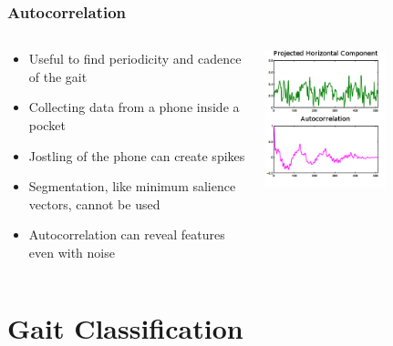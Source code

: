 \documentclass{beamer}
\begin{document}
\begin{frame}
\frametitle{Autocorrelation}
 \begin{columns}
  \begin{column}{.6\textwidth}
  \begin{itemize}
		\item Useful to find periodicity and cadence of the gait
		\item Collecting data from a phone inside a pocket
		\item Jostling of the phone can create spikes
		\item Segmentation, like minimum salience vectors, cannot be used
		\item Autocorrelation can reveal features even with noise
  \end{itemize}
  \end{column}
  \begin{column}{0.65\textwidth}
   \includegraphics[width=0.6\textwidth]{Illustrations/autocorrelationcd.png}
       \\
  \end{column}
  \end{columns}  
  
\end{frame}
\section[Gait Analysis]{Gait Classification}
\end{document}
